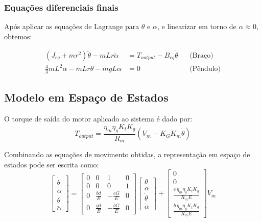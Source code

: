 \documentclass[9pt,a4paper,twocolumn,twoside]{tau-class/tau}
\begin{document}
\subsubsection*{Equações diferenciais finais}

Após aplicar as equações de Lagrange para $\theta$ e $\alpha$, e linearizar em torno de $\alpha \approx 0$, obtemos:

\begin{align}
    (J_{eq} + m r^2)\ddot{\theta} - m L r \ddot{\alpha} &= T_{output} - B_{eq}\dot{\theta} 
    && \text{(Braço)} \\
    \tfrac{4}{3} m L^2 \ddot{\alpha} - m L r \ddot{\theta} - m g L \alpha &= 0
    && \text{(Pêndulo)}
\end{align}



\subsection{Modelo em Espaço de Estados}

O torque de saída do motor aplicado ao sistema é dado por:
\begin{equation}
    T_{output} = \frac{\eta_m \eta_g K_t K_g}{R_m} \left( V_m - K_G K_m \dot{\theta} \right) 
    \label{eq:torque}
\end{equation}

Combinando as equações de movimento obtidas, a representação em espaço de estados pode ser escrita como:
\begin{equation}
\begin{bmatrix}
\dot{\theta} \\
\dot{\alpha} \\
\ddot{\theta} \\
\ddot{\alpha}
\end{bmatrix}
=
\begin{bmatrix}
0 & 0 & 1 & 0 \\
0 & 0 & 0 & 1 \\
0 & \tfrac{bd}{E} & -\tfrac{cG}{E} & 0 \\
0 & \tfrac{qd}{E} & -\tfrac{bG}{E} & 0
\end{bmatrix}
\begin{bmatrix}
\theta \\ \alpha \\ \dot{\theta} \\ \dot{\alpha}
\end{bmatrix}
+
\begin{bmatrix}
0 \\
0 \\
\tfrac{c \, \eta_m \eta_g K_t K_g}{R_m E} \\
\tfrac{b \, \eta_m \eta_g K_t K_g}{R_m E}
\end{bmatrix} V_m
\label{eq:estado}
\end{equation}
\end{document}

